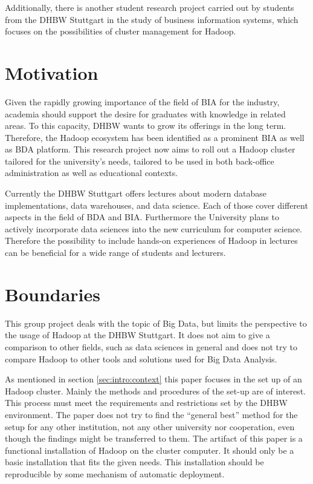Additionally, there is another student research project carried out by students from the \ac{DHBW} Stuttgart in the study of business information systems, 
which focuses on the possibilities of cluster management for Hadoop. \autocite{wi2018managementsystems} 

\section{Motivation}
\label{sec:intro:motivation}

Given the rapidly growing importance of the field of \ac{BIA} for the industry, academia
should support the desire for graduates with knowledge in related areas. To this capacity,
\ac{DHBW} wants to grow its offerings in the long term. Therefore, the Hadoop ecosystem has
been identified as a prominent \ac{BIA} as well as \ac{BDA} platform. This research project now
aims to roll out a Hadoop cluster tailored for the university’s needs, tailored to be used in
both back-office administration as well as educational contexts.

Currently the \ac{DHBW} Stuttgart offers lectures about modern database implementations, 
data warehouses, and data science. Each of those cover different aspects in the field of \ac{BDA} and \ac{BIA}. Furthermore the University plans to actively incorporate data sciences into the new curriculum for computer science.
Therefore the possibility to include hands-on experiences of Hadoop in lectures can be beneficial for a wide range of students and lecturers.

\section{Boundaries}
\label{sec:intro:boundaries}

This group project deals with the topic of Big Data, but limits the perspective to the usage of Hadoop at the \ac{DHBW} Stuttgart.
It does not aim to give a comparison to other fields, such as data sciences in general and does not try to compare Hadoop to other tools and solutions used for Big Data Analysis.

As mentioned in section \ref{sec:intro:context} this paper focuses in the set up of an Hadoop cluster.
Mainly the methods and procedures of the set-up
are of interest.
This process must meet the requirements and restrictions set by the \ac{DHBW} environment. 
The paper does not try to find the \enquote{general best} method for the setup for any other institution, not any other university nor cooperation, even though the findings might be transferred to them.
The artifact of this paper is a functional installation of Hadoop on the cluster computer.
It should only be a basic installation that fits the given needs. 
This installation should be reproducible by some mechanism of automatic deployment.

